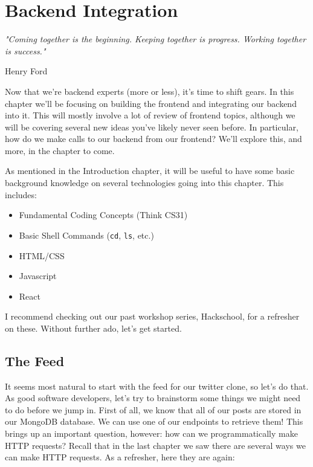 \setchapterpreamble[u]{\margintoc}

\chapter{Backend Integration}
\epigraph{\emph{"Coming together is the beginning. Keeping together is progress. Working together is success."}}{\- Henry Ford}
 
Now that we're backend experts (more or less), it's time to shift gears. In this chapter we'll be focusing on building the frontend and integrating our backend into it. This will mostly involve a lot of review of frontend topics, although we will be covering several new ideas you've likely never seen before. In particular, how do we make calls to our backend from our frontend? We'll explore this, and more, in the chapter to come.

As mentioned in the Introduction chapter, it will be useful to have some basic background knowledge on several technologies going into this chapter. This includes:

\begin{itemize}
    \item Fundamental Coding Concepts (Think CS31)
    \item Basic Shell Commands (\texttt{cd}, \texttt{ls}, etc.)
    \item HTML/CSS
    \item Javascript
    \item React
\end{itemize}

I recommend checking out our past workshop series, Hackschool, for a refresher on these. Without further ado, let's get started.

\section{The Feed}

It seems most natural to start with the feed for our twitter clone, so let's do that. As good software developers, let's try to brainstorm some things we might need to do before we jump in. First of all, we know that all of our posts are stored in our MongoDB database. We can use one of our endpoints to retrieve them! This brings up an important question, however: how can we programmatically make HTTP requests? Recall that in the last chapter we saw there are several ways we can make HTTP requests. As a refresher, here they are again:

